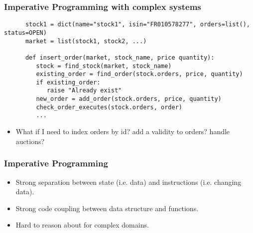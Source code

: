 \begin{frame}[fragile]
\frametitle{Imperative Programming with complex systems}
   \begin{verbatim}
      stock1 = dict(name="stock1", isin="FR010578277", orders=list(), status=OPEN)
      market = list(stock1, stock2, ...)

      def insert_order(market, stock_name, price quantity):
         stock = find_stock(market, stock_name)
         existing_order = find_order(stock.orders, price, quantity)
         if existing_order:
            raise "Already exist"
         new_order = add_order(stock.orders, price, quantity)
         check_order_executes(stock.orders, order)
         ...
   \end{verbatim}
   \begin{itemize}
      \item<2-> What if I need to index orders by id? add a validity to orders? handle auctions?
   \end{itemize}

\end{frame}

\begin{frame}
\frametitle{Imperative Programming}
   \begin{itemize}
      \item Strong separation between state (i.e. data) and instructions (i.e. changing data).

      \item Strong code coupling between data structure and functions.
      \item Hard to reason about for complex domains.
   \end{itemize}
\end{frame}



